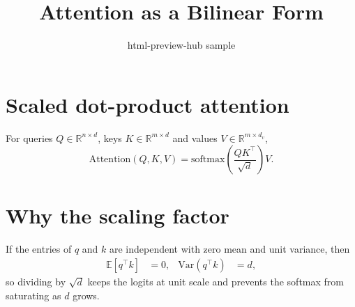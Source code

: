 \documentclass[11pt]{article}
\title{Attention as a Bilinear Form}
\author{html-preview-hub sample}
\date{}
\begin{document}
\maketitle

\section{Scaled dot-product attention}

For queries $Q \in \mathbb{R}^{n \times d}$, keys $K \in \mathbb{R}^{m \times d}$ and
values $V \in \mathbb{R}^{m \times d_v}$,
\begin{equation}
  \mathrm{Attention}(Q, K, V) = \mathrm{softmax}\!\left(\frac{QK^{\top}}{\sqrt{d}}\right) V .
\end{equation}

\section{Why the scaling factor}

If the entries of $q$ and $k$ are independent with zero mean and unit variance, then
\begin{align}
  \mathbb{E}[q^{\top} k] &= 0, &
  \mathrm{Var}(q^{\top} k) &= d ,
\end{align}
so dividing by $\sqrt{d}$ keeps the logits at unit scale and prevents the softmax from
saturating as $d$ grows.


\end{document}
